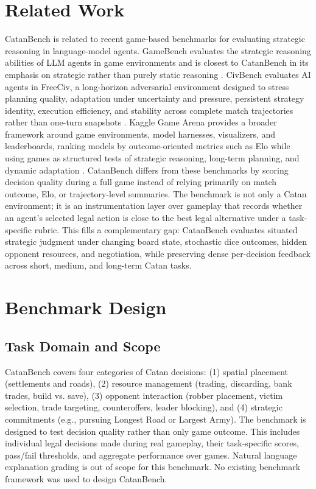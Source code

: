 \documentclass{article}
\providecommand{\citep}[1]{\cite{#1}}
\begin{document}
\section{Related Work}
\label{sec:related-work}

CatanBench is related to recent game-based benchmarks for evaluating strategic reasoning in language-model agents. GameBench evaluates the strategic reasoning abilities of LLM agents in game environments and is closest to CatanBench in its emphasis on strategic rather than purely static reasoning \citep{costarelliGameBench}. CivBench evaluates AI agents in FreeCiv, a long-horizon adversarial environment designed to stress planning quality, adaptation under uncertainty and pressure, persistent strategy identity, execution efficiency, and stability across complete match trajectories rather than one-turn snapshots \citep{clashaiCivBench}. Kaggle Game Arena provides a broader framework around game environments, model harnesses, visualizers, and leaderboards, ranking models by outcome-oriented metrics such as Elo while using games as structured tests of strategic reasoning, long-term planning, and dynamic adaptation \citep{kaggleGameArena}.
CatanBench differs from these benchmarks by scoring decision quality during a full game instead of relying primarily on match outcome, Elo, or trajectory-level summaries. The benchmark is not only a Catan environment; it is an instrumentation layer over gameplay that records whether an agent's selected legal action is close to the best legal alternative under a task-specific rubric. This fills a complementary gap: CatanBench evaluates situated strategic judgment under changing board state, stochastic dice outcomes, hidden opponent resources, and negotiation, while preserving dense per-decision feedback across short, medium, and long-term Catan tasks.

\section{Benchmark Design}
\label{sec:design}


\subsection{Task Domain and Scope}
\label{sec:domain-scope}

CatanBench covers four categories of Catan decisions: (1) spatial placement (settlements and roads), (2) resource management (trading, discarding, bank trades, build vs. save), (3) opponent interaction (robber placement, victim selection, trade targeting, counteroffers, leader blocking), and (4) strategic commitments (e.g., pursuing Longest Road or Largest Army).
The benchmark is designed to test decision quality rather than only game outcome. This includes individual legal decisions made during real gameplay, their task-specific scores, pass/fail thresholds, and aggregate performance over games. Natural language explanation grading is out of scope for this benchmark. No existing benchmark framework was used to design CatanBench.
\end{document}
